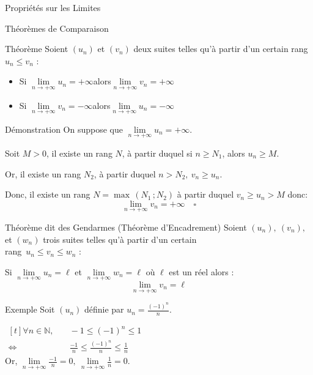 \documentclass{coursbook}
\begin{document}
    \begin{Gpartie}{Propriétés sur les Limites} 
        \begin{Spartie}{Théorèmes de Comparaison} 
            \begin{SSpartie}{Théorème} 
                Soient $(u_n)$ et $(v_n)$ deux suites telles qu'à partir d'un certain rang $u_n\leq v_n$ :
                \begin{itemize}
                    \setlength\itemsep{0.5em}
                    \item Si $\lim\limits_{n\to +\infty}u_n=+\infty$\quad alors\quad $\lim\limits_{n\to +\infty}v_n=+\infty$
                    \item Si $\lim\limits_{n\to +\infty}v_n=-\infty$\quad alors\quad $\lim\limits_{n\to +\infty}u_n=-\infty$
                \end{itemize}
            \end{SSpartie}
            \begin{SSpartie}{Démonstration} 
                On suppose que $\lim\limits_{n\to +\infty}u_n=+\infty$.

                Soit $M>0$, il existe un rang $N$, à partir duquel si $n\geq N_1$, alors $u_n\geq M$.

                Or, il existe un rang $N_2$, à partir duquel $n>N_2,\ v_n\geq u_n$.

                Donc, il existe un rang $N=\max\,(N_1\,; N_2)$ à partir duquel $v_n\geq u_n>M$ donc: \[\lim\limits_{n\to +\infty}v_n=+\infty\quad\square\]
            \end{SSpartie}
            \begin{SSpartie}{Théorème dit \og des Gendarmes \fg{} (Théorème d'Encadrement)}
                Soient $(u_n),~(v_n),$ et $(w_n)$ trois suites telles qu'à partir d'un certain \\ rang~${u_n\leq v_n\leq w_n}$ :

                Si $\lim\limits_{n\to +\infty}u_n=\ell$ et $\lim\limits_{n\to +\infty}w_n=\ell$ où $\ell$ est un réel alors :
                \[\lim\limits_{n\to +\infty}v_n=\ell\]
            \end{SSpartie}
            \begin{SSpartie}{Exemple} 
                Soit $(u_n)$ définie par $u_n=\frac{(-1)^n}{n}$.

                $\begin{aligned}[t]
                    \forall n\in\mathbb{N},&\quad-1\leq (-1)^n\leq 1 \\
                    \iff&\quad\frac{-1}{n}\leq\frac{(-1)^n}{n}\leq\frac{1}{n}
                \end{aligned}$ \\[2ex]
                Or, $\lim\limits_{n\to +\infty}\frac{-1}{n}=0,\ \lim\limits_{n\to +\infty}\frac{1}{n}=0$.


\end{SSpartie}
\end{Spartie}
\end{Gpartie}
\end{document}
